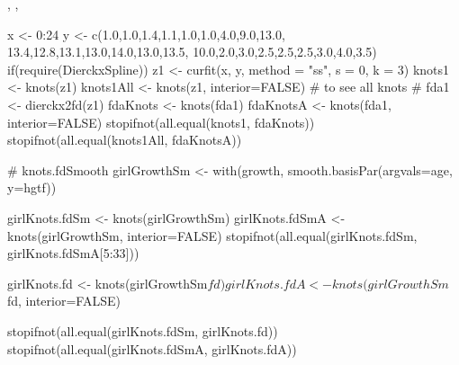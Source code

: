 \documentclass{article}
\begin{document}
\begin{SeeAlso}\relax
{},
,
\end{SeeAlso}
\begin{Examples}
\begin{ExampleCode}
x <- 0:24
y <- c(1.0,1.0,1.4,1.1,1.0,1.0,4.0,9.0,13.0,
       13.4,12.8,13.1,13.0,14.0,13.0,13.5,
       10.0,2.0,3.0,2.5,2.5,2.5,3.0,4.0,3.5)
if(require(DierckxSpline)){
   z1 <- curfit(x, y, method = "ss", s = 0, k = 3)
   knots1 <- knots(z1)
   knots1All <- knots(z1, interior=FALSE) # to see all knots
#
   fda1 <- dierckx2fd(z1)
   fdaKnots <- knots(fda1)
   fdaKnotsA <- knots(fda1, interior=FALSE)
   stopifnot(all.equal(knots1, fdaKnots))
   stopifnot(all.equal(knots1All, fdaKnotsA))
}

# knots.fdSmooth 
girlGrowthSm <- with(growth, smooth.basisPar(argvals=age, y=hgtf))

girlKnots.fdSm <- knots(girlGrowthSm) 
girlKnots.fdSmA <- knots(girlGrowthSm, interior=FALSE)
stopifnot(all.equal(girlKnots.fdSm, girlKnots.fdSmA[5:33]))

girlKnots.fd <- knots(girlGrowthSm$fd) 
girlKnots.fdA <- knots(girlGrowthSm$fd, interior=FALSE)

stopifnot(all.equal(girlKnots.fdSm, girlKnots.fd))
stopifnot(all.equal(girlKnots.fdSmA, girlKnots.fdA))

\end{ExampleCode}
\end{Examples}
\end{document}
